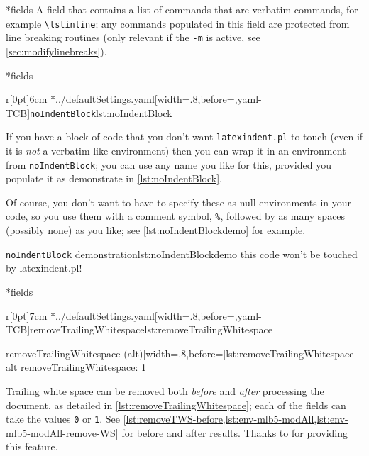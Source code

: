 *{fields}
	A field that contains a list of commands that are verbatim commands, for example \lstinline|\lstinline|; any commands populated in this field are protected from line breaking routines (only relevant if the \texttt{-m} is active, see \vref{sec:modifylinebreaks}).

*{fields}

	\begin{wrapfigure}[8]{r}[0pt]{6cm}
		\cmhlistingsfromfile[style=noIndentBlock]*{../defaultSettings.yaml}[width=.8\linewidth,before=\centering,yaml-TCB]{\texttt{noIndentBlock}}{lst:noIndentBlock}
	\end{wrapfigure}
	If you have a block of code that you don't want \texttt{latexindent.pl} to touch (even if it is \emph{not} a verbatim-like environment) then you can wrap it in an environment from \texttt{noIndentBlock}; you can use any name you like for this, provided you populate it as demonstrate in \cref{lst:noIndentBlock}.

	Of course, you don't want to have to specify these as null environments in your code, so you use them with a comment symbol, \lstinline!%!, followed by as many spaces (possibly none) as you like; see \cref{lst:noIndentBlockdemo} for example.

	\begin{cmhlistings}[style=demo,escapeinside={(*@}{@*)}]{\texttt{noIndentBlock} demonstration}{lst:noIndentBlockdemo}
        this code
                won't
     be touched
                    by
             latexindent.pl!
	\end{cmhlistings}

*{fields}\label{yaml:removeTrailingWhitespace}

	\begin{wrapfigure}[10]{r}[0pt]{7cm}
		\cmhlistingsfromfile[style=removeTrailingWhitespace]*{../defaultSettings.yaml}[width=.8\linewidth,before=\centering,yaml-TCB]{removeTrailingWhitespace}{lst:removeTrailingWhitespace}

		\vspace{.1cm}
		\begin{yaml}[numbers=none]{removeTrailingWhitespace (alt)}[width=.8\linewidth,before=\centering]{lst:removeTrailingWhitespace-alt}
removeTrailingWhitespace: 1
\end{yaml}
	\end{wrapfigure}
	Trailing white space can be removed both \emph{before} and \emph{after} processing the document, as detailed in \cref{lst:removeTrailingWhitespace}; each of the fields can take the values \texttt{0} or \texttt{1}.
	See \vref{lst:removeTWS-before,lst:env-mlb5-modAll,lst:env-mlb5-modAll-remove-WS} for before and after results.
	Thanks to \cite{vosskuhle} for providing this feature.

